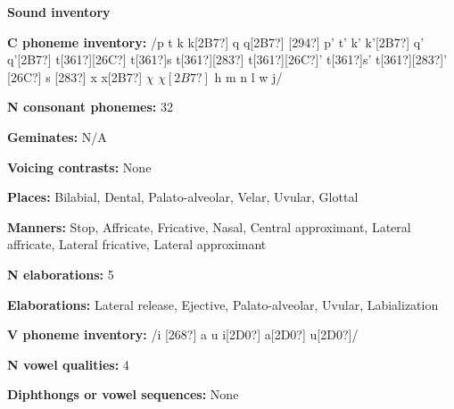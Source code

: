 \begin{styleBody}
\textbf{Sound inventory}
\end{styleBody}

\begin{styleBody}
\textbf{C phoneme inventory:} /p t k k[2B7?] q q[2B7?] [294?] p’ t’ k’ k’[2B7?] q’ q’[2B7?] t[361?][26C?] t[361?]s t[361?][283?] t[361?][26C?]’ t[361?]s’ t[361?][283?]’ [26C?] s [283?] x x[2B7?] $\chi $ $\chi [2B7?]$ h m n l w j/
\end{styleBody}

\begin{styleBody}
\textbf{N consonant phonemes:} 32
\end{styleBody}

\begin{styleBody}
\textbf{Geminates:} N/A
\end{styleBody}

\begin{styleBody}
\textbf{Voicing contrasts:} None
\end{styleBody}

\begin{styleBody}
\textbf{Places:} Bilabial, Dental, Palato-alveolar, Velar, Uvular, Glottal
\end{styleBody}

\begin{styleBody}
\textbf{Manners:} Stop, Affricate, Fricative, Nasal, Central approximant, Lateral affricate, Lateral fricative, Lateral approximant
\end{styleBody}

\begin{styleBody}
\textbf{N elaborations:} 5
\end{styleBody}

\begin{styleBody}
\textbf{Elaborations:} Lateral release, Ejective, Palato-alveolar, Uvular, Labialization
\end{styleBody}

\begin{styleBody}
\textbf{V phoneme inventory:} /i [268?] a u i[2D0?] a[2D0?] u[2D0?]/
\end{styleBody}

\begin{styleBody}
\textbf{N vowel qualities:} 4
\end{styleBody}

\begin{styleBody}
\textbf{Diphthongs or vowel sequences:} None
\end{styleBody}

